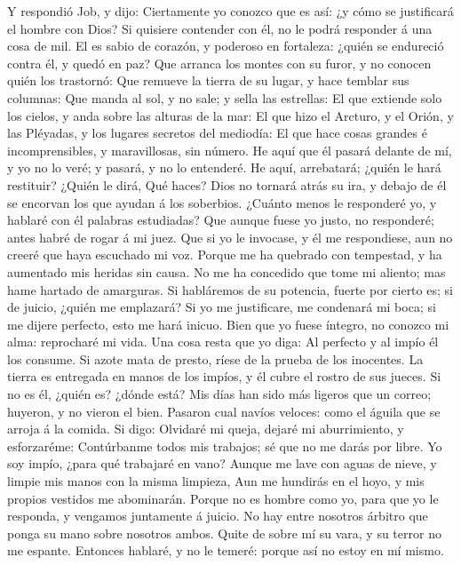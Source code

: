  Y respondió Job, y dijo:  Ciertamente yo
conozco que es así: ¿y cómo se justificará el hombre con Dios?
 Si quisiere contender con él, no le podrá responder á una
cosa de mil.  El es sabio de corazón, y poderoso en
fortaleza: ¿quién se endureció contra él, y quedó en paz? 
Que arranca los montes con su furor, y no conocen quién los trastornó:
 Que remueve la tierra de su lugar, y hace temblar sus
columnas:  Que manda al sol, y no sale; y sella las
estrellas:  El que extiende solo los cielos, y anda sobre
las alturas de la mar:  El que hizo el Arcturo, y el
Orión, y las Pléyadas, y los lugares secretos del mediodía:
 El que hace cosas grandes é incomprensibles, y
maravillosas, sin número.  He aquí que él pasará delante
de mí, y yo no lo veré; y pasará, y no lo entenderé.  He
aquí, arrebatará; ¿quién le hará restituir? ¿Quién le dirá, Qué haces?
 Dios no tornará atrás su ira, y debajo de él se encorvan
los que ayudan á los soberbios.  ¿Cuánto menos le
responderé yo, y hablaré con él palabras estudiadas?  Que
aunque fuese yo justo, no responderé; antes habré de rogar á mi juez.
 Que si yo le invocase, y él me respondiese, aun no
creeré que haya escuchado mi voz.  Porque me ha quebrado
con tempestad, y ha aumentado mis heridas sin causa.  No
me ha concedido que tome mi aliento; mas hame hartado de amarguras.
 Si habláremos de su potencia, fuerte por cierto es; si
de juicio, ¿quién me emplazará?  Si yo me justificare, me
condenará mi boca; si me dijere perfecto, esto me hará inicuo.
 Bien que yo fuese íntegro, no conozco mi alma:
reprocharé mi vida.  Una cosa resta que yo diga: Al
perfecto y al impío él los consume.  Si azote mata de
presto, ríese de la prueba de los inocentes.  La tierra
es entregada en manos de los impíos, y él cubre el rostro de sus jueces.
Si no es él, ¿quién es? ¿dónde está?  Mis días han sido
más ligeros que un correo; huyeron, y no vieron el bien. 
Pasaron cual navíos veloces: como el águila que se arroja á la comida.
 Si digo: Olvidaré mi queja, dejaré mi aburrimiento, y
esforzaréme:  Contúrbanme todos mis trabajos; sé que no
me darás por libre.  Yo soy impío, ¿para qué trabajaré en
vano?  Aunque me lave con aguas de nieve, y limpie mis
manos con la misma limpieza,  Aun me hundirás en el hoyo,
y mis propios vestidos me abominarán.  Porque no es
hombre como yo, para que yo le responda, y vengamos juntamente á juicio.
 No hay entre nosotros árbitro que ponga su mano sobre
nosotros ambos.  Quite de sobre mí su vara, y su terror
no me espante.  Entonces hablaré, y no le temeré: porque
así no estoy en mí mismo.

